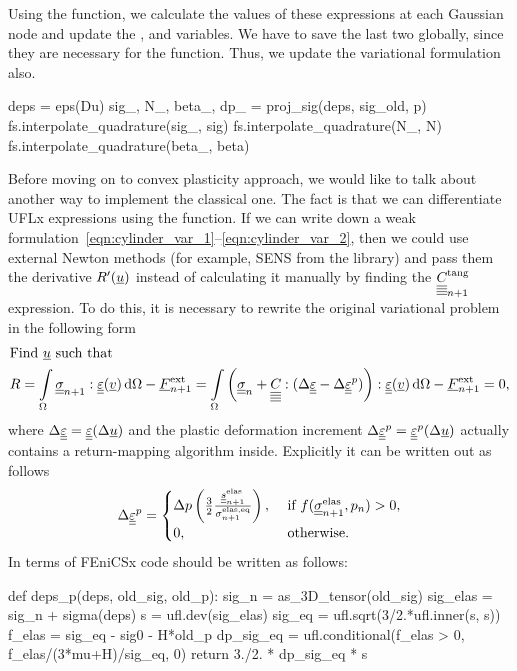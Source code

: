 \documentclass[12pt]{article}
\begin{document}
Using the  function, we calculate the values of these expressions at each Gaussian node and update the ,  and  variables. We have to save the last two globally, since they are necessary for the  function. Thus, we update the variational formulation also.
\begin{pythoncode}
    deps = eps(Du)
    sig_, N_, beta_, dp_ = proj_sig(deps, sig_old, p)
    fs.interpolate_quadrature(sig_, sig)
    fs.interpolate_quadrature(N_, N)
    fs.interpolate_quadrature(beta_, beta)
\end{pythoncode}

Before moving on to convex plasticity approach, we would like to talk about another way to implement the classical one. The fact is that we can differentiate UFLx expressions using the  function. If we can write down a weak formulation~\ref{eqn:cylinder_var_1}--\ref{eqn:cylinder_var_2}, then we could use external Newton methods (for example, SENS from the  library) and pass them the derivative $R^\prime(\underline{u})$ instead of calculating it manually by finding the $\underline{\underline{\underline{\underline{C_{}}}}}_{n+1}^\text{tang}$ expression. To do this, it is necessary to rewrite the original variational problem in the following form
\begin{align}
    & \text{Find } \underline{u} \text{ such that} \label{eqn:cylinder_SNES_var_1} \\
    & R = \int\limits_\Omega \underline{\underline{\sigma}}_{n+1} : \underline{\underline{\varepsilon}}(\underline{v}) \, \mathrm{d}\Omega - \underline{F}_{n+1}^\text{ext} = \int\limits_\Omega \left( \underline{\underline{\sigma}}_n + \underline{\underline{\underline{\underline{C_{}}}}} : (\Delta\underline{\underline{\varepsilon}} - \Delta\underline{\underline{\varepsilon}}^p) \right) : \underline{\underline{\varepsilon}}(\underline{v}) \, \mathrm{d}\Omega - \underline{F}_{n+1}^\text{ext} = 0, \label{eqn:cylinder_SNES_var_2}
\end{align}
where $\Delta\underline{\underline{\varepsilon}} = \underline{\underline{\varepsilon}}(\Delta\underline{u})$ and the plastic deformation increment $\Delta\underline{\underline{\varepsilon}}^p = \underline{\underline{\varepsilon}}^p(\Delta\underline{u})$ actually contains a return-mapping algorithm inside. Explicitly it can be written out as follows
\begin{equation}
    \Delta\underline{\underline{\varepsilon}}^p = 
        \begin{cases}
            \Delta p \left( \frac{3}{2}\frac{\underline{\underline{s}}_{n+1}^\text{elas}} {\sigma_{n+1}^\text{elas,eq}} \right), & \text{ if } f(\underline{\underline{\sigma}}_{n+1}^{\text{elas}}, p_n) > 0,  \\
            0, & \text{ otherwise}.
        \end{cases}
\end{equation}
In terms of FEniCSx code should be written as follows:
\begin{pythoncode}
    def deps_p(deps, old_sig, old_p):
        sig_n = as_3D_tensor(old_sig)
        sig_elas = sig_n + sigma(deps)
        s = ufl.dev(sig_elas)
        sig_eq = ufl.sqrt(3/2.*ufl.inner(s, s))
        f_elas = sig_eq - sig0 - H*old_p
        dp_sig_eq = ufl.conditional(f_elas > 0, f_elas/(3*mu+H)/sig_eq, 0) 
        return 3./2. * dp_sig_eq * s 
\end{pythoncode}
\end{document}
